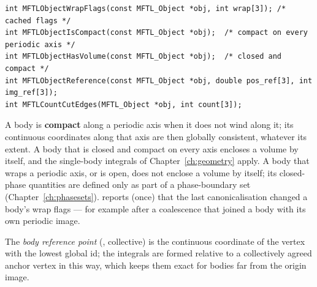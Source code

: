 \begin{lstlisting}[numbers=none]
int MFTLObjectWrapFlags(const MFTL_Object *obj, int wrap[3]); /* cached flags */
int MFTLObjectIsCompact(const MFTL_Object *obj);  /* compact on every periodic axis */
int MFTLObjectHasVolume(const MFTL_Object *obj);  /* closed and compact */
int MFTLObjectReference(const MFTL_Object *obj, double pos_ref[3], int img_ref[3]);
int MFTLCountCutEdges(MFTL_Object *obj, int count[3]);
\end{lstlisting}
A body is \textbf{compact} along a periodic axis when it does not wind along it; its continuous
coordinates along that axis are then globally consistent, whatever its extent. A body that is
closed and compact on every axis encloses a volume by itself, and the single-body integrals of
Chapter~\ref{ch:geometry} apply. A body that wraps a periodic axis, or is open, does not enclose a
volume by itself; its closed-phase quantities are defined only as part of a phase-boundary set
(Chapter~\ref{ch:phasesets}).  reports (once) that the last
canonicalisation changed a body's wrap flags --- for example after a coalescence that joined a
body with its own periodic image.

The \emph{body reference point} (, collective) is the continuous
coordinate of the vertex with the lowest global id; the integrals are formed relative to a
collectively agreed anchor vertex in this way, which keeps them exact for bodies far from the
origin image.
